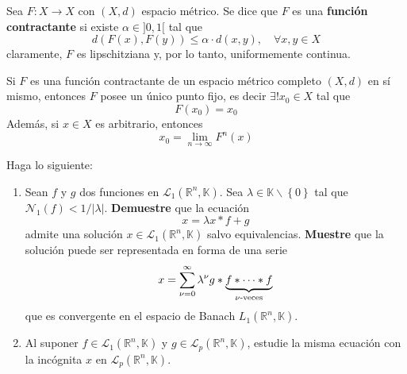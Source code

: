 \documentclass[12pt]{report}
\theoremstyle{largebreak}
\newcommand\abs[1]{\ensuremath{\left|#1\right|}}
\newcommand\cf[3]{\ensuremath{#1:#2\rightarrow#3}}
\newcommand{\N}[2]{\ensuremath{\mathcal{N}_{#1}\left(#2\right)}}
\begin{document}
    \begin{mydef}
        Sea $\cf{F}{X}{X}$ con $(X,d)$ espacio métrico. Se dice que $F$ es una \textbf{función contractante} si existe $\alpha\in]0,1[$ tal que
        \begin{equation*}
            d(F(x),F(y))\leq \alpha\cdot d(x,y),\quad\forall x,y\in X
        \end{equation*}
        claramente, $F$ es lipschitziana y, por lo tanto, uniformemente continua.
    \end{mydef}

    \begin{theor}
        Si $F$ es una función contractante de un espacio métrico completo $(X,d)$ en sí mismo, entonces $F$ posee un único punto fijo, es decir $\exists! x_0\in X$ tal que
         \begin{equation*}
            F(x_0)=x_0
         \end{equation*}
         Además, si $x\in X$ es arbitrario, entonces
         \begin{equation*}
            x_0=\lim_{ n\rightarrow\infty}F^n(x)
         \end{equation*}
    \end{theor}

    \begin{excer}
        Haga lo siguiente:
        \begin{enumerate}
            \item Sean $f$ y $g$ dos funciones en $\mathcal{L}_1(\mathbb{R}^n,\mathbb{K})$. Sea $\lambda\in\mathbb{K}\backslash\left\{ 0\right\}$ tal que $\N{1}{f}<1/\abs{\lambda}$. \textbf{Demuestre} que la ecuación
            \begin{equation*}
                x=\lambda x*f+g
            \end{equation*}
            admite una solución $x\in\mathcal{L}_1(\mathbb{R}^n,\mathbb{K})$ salvo equivalencias. \textbf{Muestre} que la solución puede ser representada en forma de una serie
            \begin{equation*}
                x=\sum_{\nu=0}^\infty \lambda^\nu g*\underbrace{f*\cdots*f}_{\nu\textup{-veces}}
            \end{equation*}
            que es convergente en el espacio de Banach $L_1(\mathbb{R}^n,\mathbb{K})$.

            \item Al suponer $f\in\mathcal{L}_1(\mathbb{R}^n,\mathbb{K})$ y $g\in\mathcal{L}_p(\mathbb{R}^n,\mathbb{K})$, estudie la misma ecuación con la incógnita $x$ en $\mathcal{L}_p(\mathbb{R}^n,\mathbb{K})$.
        \end{enumerate}
    \end{excer}
\end{document}
